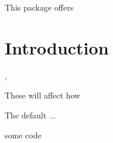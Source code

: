 \documentclass[10pt]{article}
\begin{document}
  

\begin{typesetabstract}
 
This package offers 
\end{typesetabstract}


\section{Introduction}

\begin{codedescribe}{\somecmd,\somecmd}
\begin{codesyntax}%
\tsmacro{\somecmd}{}
\tsmacro{\somecmd}{}
\end{codesyntax}
These will affect how
\end{codedescribe}
\begin{tsremark}
  The default ...
\end{tsremark}


\begin{codestore}[demoA]
some code
\end{codestore}

\end{document}
